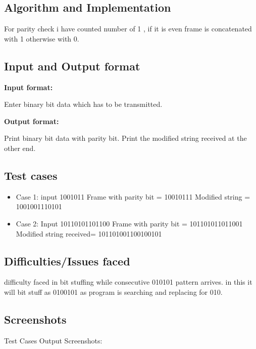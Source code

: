 \documentclass[12pt]{article}
\begin{document}
 



\subsection{Algorithm and Implementation}

For parity check i have counted number of 1 , if it is even frame is concatenated with 1 otherwise with 0.

\subsection{Input and Output format}

\textbf{Input format:}


Enter binary bit data which has to be transmitted.



\textbf{Output format:}

Print binary bit data with parity bit.
Print the modified string received at the other end.
	



\subsection{Test cases}
\begin{itemize}


\item Case 1:
input 1001011
Frame with parity bit = 10010111
Modified string = 1001001110101

\item Case 2:
Input 10110101101100
Frame with parity bit = 101101011011001
Modified string received= 101101001100100101


\end{itemize}


\subsection{Difficulties/Issues faced}
difficulty faced in bit stuffing while consecutive 010101 pattern arrives.
in this it will bit stuff as 0100101 as program is searching and replacing for 010.
\subsection{Screenshots}
Test Cases Output Screenshots:
\end{document}
